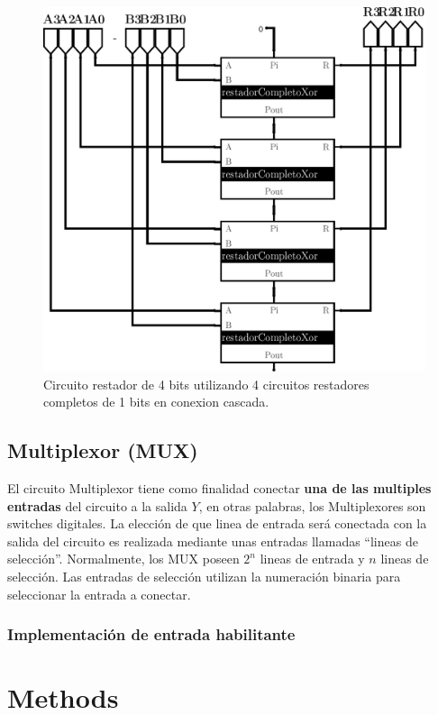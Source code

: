 \documentclass[
]{book}
\begin{document}
{\begin{figure}

{\centering \includegraphics[width=0.6\linewidth]{./images/circRestador4bits} 

}

\caption{Circuito restador de 4 bits utilizando 4 circuitos restadores completos de 1 bits en conexion cascada.}\label{fig:unnamed-chunk-6}
\end{figure}

\hypertarget{multiplexor-mux}{%
\section{Multiplexor (MUX)}\label{multiplexor-mux}}

El circuito Multiplexor tiene como finalidad conectar \textbf{una de las multiples entradas} del circuito a la salida \(Y\), en otras palabras, los Multiplexores son switches digitales. La elección de que linea de entrada será conectada con la salida del circuito es realizada mediante unas entradas llamadas ``lineas de selección''. Normalmente, los MUX poseen \(2^n\) lineas de entrada y \(n\) lineas de selección. Las entradas de selección utilizan la numeración binaria para seleccionar la entrada a conectar.

\hypertarget{implementaciuxf3n-de-entrada-habilitante}{%
\subsection{Implementación de entrada habilitante}\label{implementaciuxf3n-de-entrada-habilitante}}

\hypertarget{methods}{%
\chapter{Methods}\label{methods}}

}
\end{document}
